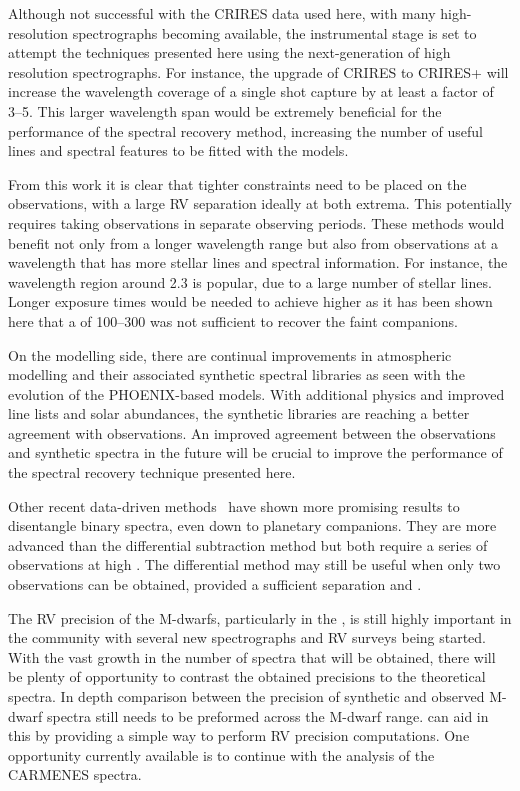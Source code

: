 Although not successful with the CRIRES data used here, with many high-resolution \nir{} spectrographs becoming available, the instrumental stage is set to attempt the techniques presented here using the next-generation of high resolution spectrographs.
For instance, the upgrade of CRIRES to CRIRES+ will increase the wavelength coverage of a single shot capture by at least a factor of 3--5.
This larger wavelength span would be extremely beneficial for the \textchisquared{} performance of the spectral recovery method, increasing the number of useful lines and spectral features to be fitted with the models.

From this work it is clear that tighter constraints need to be placed on the observations, with a large {RV} separation ideally at both extrema.
This potentially requires taking observations in separate observing periods.
These methods would benefit not only from a longer wavelength range but also from observations at a wavelength that has more stellar lines and spectral information.
For instance, the wavelength region around 2.3\um{} is popular, due to a large number of stellar  lines.
Longer exposure times would be needed to achieve higher \snr{} as it has been shown here that a \snr{} of 100--300 was not sufficient to recover the faint companions.

On the modelling side, there are continual improvements in atmospheric modelling and their associated synthetic spectral libraries as seen with the evolution of the PHOENIX-based models.
With additional physics and improved line lists and solar abundances, the synthetic libraries are reaching a better agreement with \nir{} observations.
An improved agreement between the \nir{} observations and synthetic spectra in the future will be crucial to improve the performance of the spectral recovery technique presented here.

Other recent data-driven methods~\citep[e.g.][]{piskorz_evidence_2016, czekala_disentangling_2017} have shown more promising results to disentangle binary spectra, even down to planetary companions.
They are more advanced than the differential subtraction method but both require a series of observations at high \snr{}.
The differential method may still be useful when only two observations can be obtained, provided a sufficient separation and \snr{}.

The {RV} precision of the M-dwarfs, particularly in the \nir{}, is still highly important in the community with several new \nir{} spectrographs and {RV} surveys being started.
With the vast growth in the number of \nir{} spectra that will be obtained, there will be plenty of opportunity to contrast the obtained precisions to the theoretical spectra.
In depth comparison between the precision of synthetic and observed M-dwarf spectra still needs to be preformed across the M-dwarf range.
\Eniric{} can aid in this by providing a simple way to perform {RV} precision computations.
One opportunity currently available is to continue with the analysis of the {CARMENES} spectra.

